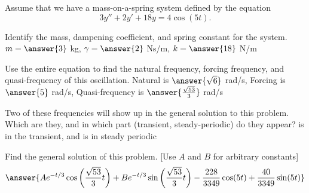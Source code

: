 \documentclass{ximera}
\begin{document}
\begin{exercise}
    Assume that we have a mass-on-a-spring system defined by the equation
    \begin{equation*}
        3y'' + 2y' + 18y = 4\cos(5t).
    \end{equation*}
    
    Identify the mass, dampening coefficient, and spring constant for the system.
    $m = \answer{3}$ kg, $\gamma = \answer{2}$ Ns/m, $k = \answer{18}$ N/m
    \begin{problem}
        Use the entire equation to find the natural frequency, forcing frequency, and quasi-frequency of this oscillation.
        Natural is $\answer{\sqrt{6}}$ rad/s, Forcing is $\answer{5}$ rad/s, Quasi-frequency is $\answer{\frac{\sqrt{53}}{3}}$ rad/s
        \begin{problem}
            Two of these frequencies will show up in the general solution to this problem. Which are they, and in which part (transient, steady-periodic) do they appear?
             is in the transient, and  is in steady periodic
            \begin{problem}
                Find the general solution of this problem. [Use $A$ and $B$ for arbitrary constants]
                \[
                    \answer{Ae^{-t/3}\cos\left(\frac{\sqrt{53}}{3}t\right) + Be^{-t/3}\sin\left(\frac{\sqrt{53}}{3}t\right) - \frac{228}{3349} \cos(5t) + \frac{40}{3349}\sin(5t)}
                \]
            \end{problem}
        \end{problem}
    \end{problem}
\end{exercise}
\end{document}
